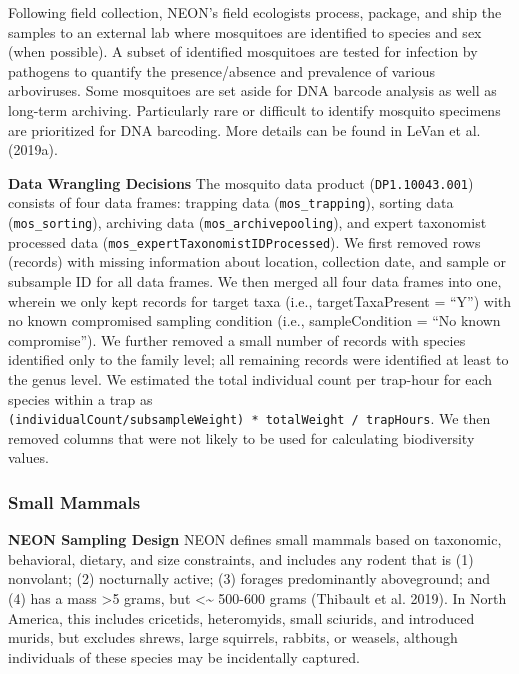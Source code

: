 \documentclass[
  12pt,
]{article}
\begin{document}
Following field collection, NEON's field ecologists process, package, and ship the samples to an external lab where mosquitoes are identified to species and sex (when possible). A subset of identified mosquitoes are tested for infection by pathogens to quantify the presence/absence and prevalence of various arboviruses. Some mosquitoes are set aside for DNA barcode analysis as well as long-term archiving. Particularly rare or difficult to identify mosquito specimens are prioritized for DNA barcoding. More details can be found in LeVan et al. (2019a).

\textbf{Data Wrangling Decisions} The mosquito data product (\texttt{DP1.10043.001}) consists of four data frames: trapping data (\texttt{mos\_trapping}), sorting data (\texttt{mos\_sorting}), archiving data (\texttt{mos\_archivepooling}), and expert taxonomist processed data (\texttt{mos\_expertTaxonomistIDProcessed}). We first removed rows (records) with missing information about location, collection date, and sample or subsample ID for all data frames. We then merged all four data frames into one, wherein we only kept records for target taxa (i.e., targetTaxaPresent = ``Y'') with no known compromised sampling condition (i.e., sampleCondition = ``No known compromise''). We further removed a small number of records with species identified only to the family level; all remaining records were identified at least to the genus level. We estimated the total individual count per trap-hour for each species within a trap as \texttt{(individualCount/subsampleWeight)\ *\ totalWeight\ /\ trapHours}. We then removed columns that were not likely to be used for calculating biodiversity values.

\hypertarget{small-mammals}{%
\subsubsection{Small Mammals}\label{small-mammals}}

\textbf{NEON Sampling Design} NEON defines small mammals based on taxonomic, behavioral, dietary, and size constraints, and includes any rodent that is (1) nonvolant; (2) nocturnally active; (3) forages predominantly aboveground; and (4) has a mass \textgreater5 grams, but \textless\textasciitilde{} 500-600 grams (Thibault et al. 2019). In North America, this includes cricetids, heteromyids, small sciurids, and introduced murids, but excludes shrews, large squirrels, rabbits, or weasels, although individuals of these species may be incidentally captured.
\end{document}
